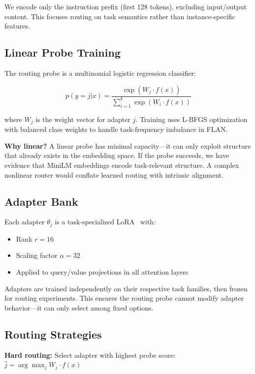 We encode only the instruction prefix (first 128 tokens), excluding input/output content. This focuses routing on task semantics rather than instance-specific features.

\subsection{Linear Probe Training}

The routing probe is a multinomial logistic regression classifier:

\begin{equation}
p(y = j | x) = \frac{\exp(W_j \cdot f(x))}{\sum_{i=1}^k \exp(W_i \cdot f(x))}
\end{equation}

where $W_j$ is the weight vector for adapter $j$. Training uses L-BFGS optimization with balanced class weights to handle task-frequency imbalance in FLAN.

\textbf{Why linear?} A linear probe has minimal capacity---it can only exploit structure that already exists in the embedding space. If the probe succeeds, we have evidence that MiniLM embeddings encode task-relevant structure. A complex nonlinear router would conflate learned routing with intrinsic alignment.

\subsection{Adapter Bank}

Each adapter $\theta_j$ is a task-specialized LoRA~\cite{hu2021lora} with:
\begin{itemize}
    \item Rank $r = 16$
    \item Scaling factor $\alpha = 32$
    \item Applied to query/value projections in all attention layers
\end{itemize}

Adapters are trained independently on their respective task families, then frozen for routing experiments. This ensures the routing probe cannot modify adapter behavior---it can only select among fixed options.

\subsection{Routing Strategies}

\textbf{Hard routing:} Select adapter with highest probe score: $\hat{j} = \arg\max_j W_j \cdot f(x)$


